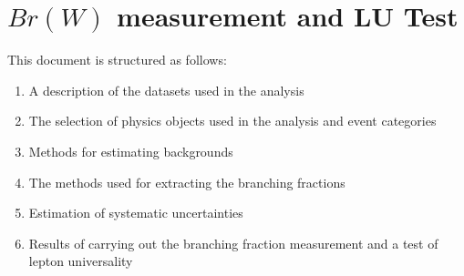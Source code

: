 \chapter{$Br(W)$ measurement and LU Test}
\label{sec:analysis}







This document is structured as follows:

\begin{enumerate}
    \item A description of the datasets used in the analysis
    \item The selection of physics objects used in the analysis and event categories
    \item Methods for estimating backgrounds
    \item The methods used for extracting the branching fractions
    \item Estimation of systematic uncertainties
    \item Results of carrying out the branching fraction measurement and a test of lepton universality
\end{enumerate}
    
    
\newpage


\newpage


\newpage


\newpage



\newpage


\newpage
